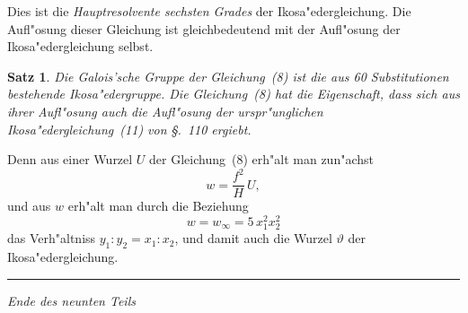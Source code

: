\documentclass[12pt,a4paper]{article}
\theoremstyle{plain}
\newtheorem{satz}{Satz}[section]
\begin{document}
Dies ist die \emph{Hauptresolvente sechsten Grades} der Ikosa"edergleichung. Die Aufl"osung dieser Gleichung ist gleichbedeutend mit der Aufl"osung der Ikosa"edergleichung selbst.

\begin{satz}
Die Galois'sche Gruppe der Gleichung~(8) ist die aus 60 Substitutionen bestehende Ikosa"edergruppe. Die Gleichung~(8) hat die Eigenschaft, dass sich aus ihrer Aufl"osung auch die Aufl"osung der urspr"unglichen Ikosa"edergleichung~(11) von \S.~110 ergiebt.
\end{satz}

Denn aus einer Wurzel $U$ der Gleichung~(8) erh"alt man zun"achst
\[w = \frac{f^2}{H}\,U,\]
und aus $w$ erh"alt man durch die Beziehung
\[w = w_\infty = 5\,x_1^2 x_2^2\]
das Verh"altniss $y_1 : y_2 = x_1 : x_2$, und damit auch die Wurzel $\vartheta$ der Ikosa"edergleichung.

\vspace{2em}
\noindent\rule{\textwidth}{0.4pt}
\vspace{1em}

\begin{center}
\textit{Ende des neunten Teils}
\end{center}
\end{document}
